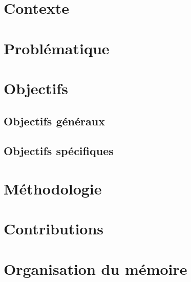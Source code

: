 
\section{Contexte}

\section{Problématique}

\section{Objectifs}

\subsection{Objectifs généraux}

\subsection{Objectifs spécifiques}

\section{Méthodologie}

\section{Contributions}

\section{Organisation du mémoire}